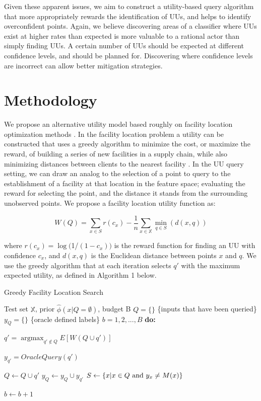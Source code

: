 \documentclass[letterpaper]{article} %
\DeclareMathOperator*{\argmax}{argmax}
\begin{document}
Given these apparent issues, we aim to construct a utility-based query algorithm that more appropriately rewards the identification of UUs, and helps to identify overconfident points. Again, we believe discovering areas of a classifier where UUs exist at higher rates than expected is more valuable to a rational actor than simply finding UUs.  A certain number of UUs should be expected at different confidence levels, and should be planned for.  Discovering where confidence levels are incorrect can allow better mitigation strategies. 

\section{Methodology}

We propose an alternative utility model based roughly on facility location optimization methods  \citep{farahani2009facility}. In the facility location problem a utility can be constructed that uses a greedy algorithm to minimize the cost, or maximize the reward, of building a series of new facilities in a supply chain, while also minimizing distances between clients to the nearest facility  \citep{guha1999greedy, arya2004local}. In the UU query setting, we can draw an analog to the selection of a point to query to the establishment of a facility at that location in the feature space; evaluating the reward for selecting the point, and the distance it stands from the surrounding unobserved points. We propose a facility location utility function as: 

$$W(Q) = \sum_{x \in S} r \left(c_x\right) - \frac{1}{n} \sum_{x \in \mathbb{X}} \min_{q \in S}\left(d\left(x,q\right)\right)$$

where $r\left(c_x\right) = \log($1/$(1-c_x))$ is the reward function for finding an UU with confidence $c_{x}$, and $d(x,q)$ is the Euclidean distance between points $x$ and $q$. We use the greedy algorithm that at each iteration selects $q'$ with the maximum expected utility, as defined in Algorithm 1 below. 

\begin{algorithm}
	\caption{Greedy Facility Location Search}
	\label{alg:Greedy}
	\begin{algorithmic}
		 Test set $\mathbb{X}$, prior $\hat{\phi}\left(x|Q=\emptyset\right)$, budget B
		\STATE $Q=\{\}$ \{inputs that have been queried\}
		\STATE $y_Q = \{\}$ \{oracle defined labels\}
		 $b = 1, 2, ..., B$ {\bfseries do:}

		\STATE $q' = \argmax_{q' \not\in Q} E \left[W\left(Q \cup q'\right) \right]$

		\STATE $y_{q'} = OracleQuery(q')$

		\STATE $Q \leftarrow Q \cup q'$
		\STATE $y_Q \leftarrow y_Q \cup y_{q'}$
		\STATE $S \leftarrow \left\{x | x \in Q \space \text{ and } y_x \neq M(x) \right\}$

		\STATE $b \leftarrow b + 1$
			

	\end{algorithmic}
\end{algorithm}
\end{document}
